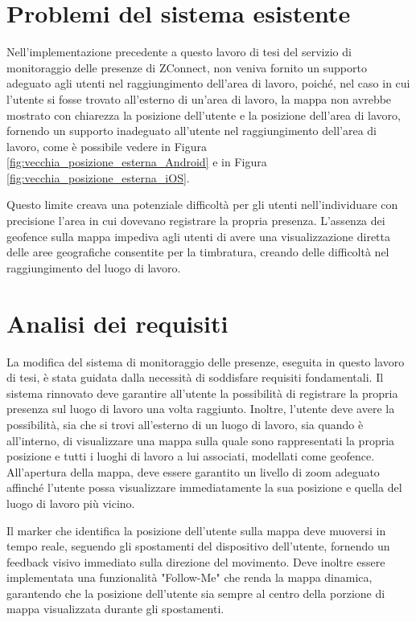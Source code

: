 \section{Problemi del sistema esistente}\label{Problemi_sistema}

Nell'implementazione precedente a questo lavoro di tesi del servizio di monitoraggio delle presenze di ZConnect, non veniva fornito un supporto adeguato agli utenti nel raggiungimento dell'area di lavoro, poiché, nel caso in cui l'utente si fosse trovato all'esterno di un'area di lavoro, la mappa non avrebbe mostrato con chiarezza la posizione dell'utente e la posizione dell'area di lavoro, fornendo un supporto inadeguato all'utente nel raggiungimento dell'area di lavoro, come è possibile vedere in Figura \ref{fig:vecchia_posizione_esterna_Android} e in Figura \ref{fig:vecchia_posizione_esterna_iOS}.

Questo limite creava una potenziale difficoltà per gli utenti nell'individuare con precisione l'area in cui dovevano registrare la propria presenza. L'assenza dei geofence sulla mappa impediva agli utenti di avere una visualizzazione diretta delle aree geografiche consentite per la timbratura, creando delle difficoltà nel raggiungimento del luogo di lavoro.

\section{Analisi dei requisiti}
La modifica del sistema di monitoraggio delle presenze, eseguita in questo lavoro di tesi, è stata guidata dalla necessità di soddisfare requisiti fondamentali. Il sistema rinnovato deve garantire all'utente la possibilità di registrare la propria presenza sul luogo di lavoro una volta raggiunto. Inoltre, l'utente deve avere la possibilità, sia che si trovi all'esterno di un luogo di lavoro, sia quando è all'interno, di visualizzare una mappa sulla quale sono rappresentati la propria posizione e tutti i luoghi di lavoro a lui associati, modellati come geofence. All'apertura della mappa, deve essere garantito un livello di zoom adeguato affinché l'utente possa visualizzare immediatamente la sua posizione e quella del luogo di lavoro più vicino.

Il marker che identifica la posizione dell'utente sulla mappa deve muoversi in tempo reale, seguendo gli spostamenti del dispositivo dell'utente, fornendo un feedback visivo immediato sulla direzione del movimento. Deve inoltre essere implementata una funzionalità "Follow-Me" che renda la mappa dinamica, garantendo che la posizione dell'utente sia sempre al centro della porzione di mappa visualizzata durante gli spostamenti.

